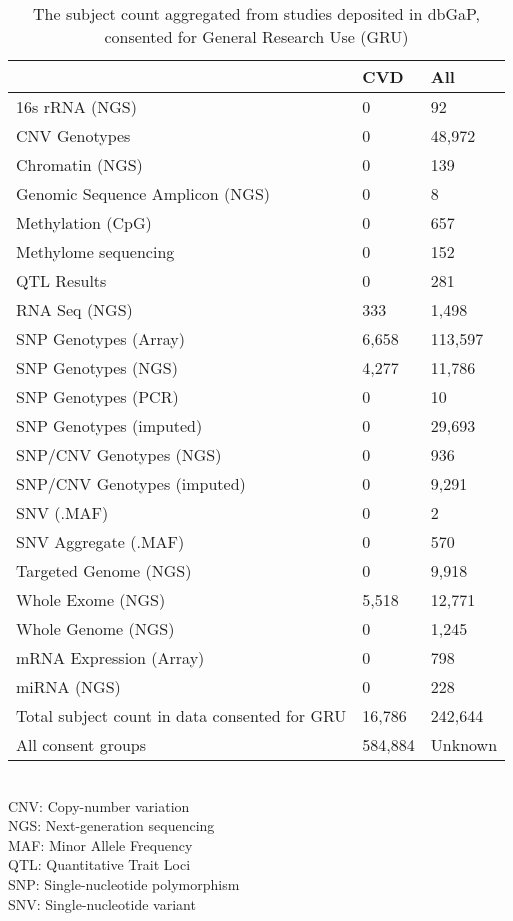 \documentclass[11pt,letterpaper]{article}
\begin{document}
	\begin{table}[]
		\caption{The subject count aggregated from studies deposited in dbGaP, consented for General Research Use (GRU)
			\label{tab:dbgapSubject}}
		{\begin{tabular}{l l l}
				\hline
				& \textbf{CVD} &  \textbf{All}                         \\ \hline
				16s rRNA (NGS)                 &     0 &      92  \\
				CNV Genotypes                  &     0 &   48,972 \\
				Chromatin (NGS)                &     0 &     139  \\
				Genomic Sequence Amplicon (NGS)&     0 &       8  \\
				Methylation (CpG)              &     0 &     657  \\
				Methylome sequencing           &     0 &     152  \\
				QTL Results                    &     0 &     281  \\
				RNA Seq (NGS)                  &   333 &    1,498 \\
				SNP Genotypes (Array)          &  6,658 &  113,597\\
				SNP Genotypes (NGS)            &  4,277 &   11,786\\
				SNP Genotypes (PCR)            &     0 &      10  \\
				SNP Genotypes (imputed)        &     0 &   29,693 \\
				SNP/CNV Genotypes (NGS)        &     0 &     936  \\
				SNP/CNV Genotypes (imputed)    &     0 &    9,291 \\
				SNV (.MAF)                     &     0 &       2  \\
				SNV Aggregate (.MAF)           &     0 &     570  \\
				Targeted Genome (NGS)          &     0 &    9,918 \\
				Whole Exome (NGS)              &  5,518 &   12,771\\
				Whole Genome (NGS)             &     0 &    1,245 \\
				mRNA Expression (Array)        &     0 &     798  \\
				miRNA (NGS)                        & 0 &   228 \\ \hline
				Total subject count in data consented for GRU & 16,786 & 242,644 \\ \hline
				All consent groups & 584,884 & Unknown \\	\hline
		\end{tabular}}\\ \newline
	\footnotesize{CNV: Copy-number variation\\NGS: Next-generation sequencing\\MAF: Minor Allele Frequency\\ QTL: Quantitative Trait Loci\\SNP: Single-nucleotide polymorphism\\ SNV: Single-nucleotide variant}
	\end{table}
\end{document}

